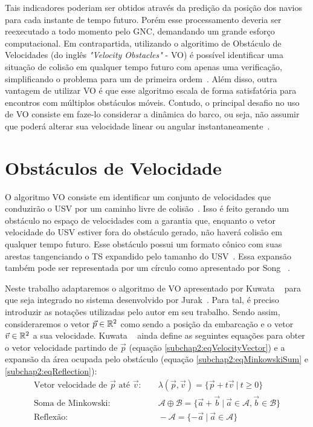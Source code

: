         Tais indicadores poderiam ser obtidos através da predição da posição dos navios para cada instante de tempo futuro. Porém esse processamento deveria ser reexecutado a todo momento pelo GNC, demandando um grande esforço computacional. Em contrapartida, utilizando o algoritimo de Obstáculo de Velocidades (do inglês \textit{"Velocity Obstacles"} - VO) é possível identificar uma situação de colisão em qualquer tempo futuro com apenas uma verificação, simplificando o problema para um de primeira ordem~\cite{KUWATA2014110}. Além disso, outra vantagem de utilizar VO é que esse algoritmo escala de forma satisfatória para encontros com múltiplos obstáculos móveis. Contudo, o principal desafio no uso de VO consiste em faze-lo considerar a dinâmica do barco, ou seja, não assumir que poderá alterar sua velocidade linear ou angular instantaneamente~\cite{HUANG2019142}.
        
    \section{Obstáculos de Velocidade}\label{subchap2:vo}
        O algoritmo VO consiste em identificar um conjunto de velocidades que conduzirão o USV por um caminho livre de colisão~\cite{HUANG2019142}. Isso é feito gerando um obstáculo no espaço de velocidades com a garantia que, enquanto o vetor velocidade do USV estiver fora do obstáculo gerado, não haverá colisão em qualquer tempo futuro. Esse obstáculo possui um formato cônico com suas arestas tangenciando o TS expandido pelo tamanho do USV~\cite{KUWATA2014110}. Essa expansão também pode ser representada por um círculo como apresentado por Song \etal~\cite{SONG2018351}.
        
        Neste trabalho adaptaremos o algoritmo de VO apresentado por Kuwata \etal ~\cite{KUWATA2014110} para que seja integrado no sistema desenvolvido por Jurak~\cite{JURAK2020}. Para tal, é preciso introduzir as notações utilizadas pelo autor em seu trabalho. Sendo assim, consideraremos o vetor $\vec{p} \in \mathbb{R}^2$ como sendo a posição da embarcação e o vetor $\vec{v} \in \mathbb{R}^2$ a sua velocidade. Kuwata \etal ~\cite{KUWATA2014110} ainda define as seguintes equações para obter o vetor velocidade partindo de $\vec{p}$ (equação \eqref{subchap2:eqVelocityVector}) e a expansão da área ocupada pelo obstáculo (equação \eqref{subchap2:eqMinkowskiSum} e \eqref{subchap2:eqReflection}):
        \begin{align}
            \text{Vetor velocidade de $\vec{p}$ até $\vec{v}$:}\quad&~\lambda(\vec{p}, \vec{v}) = \{\vec{p} + t\vec{v}~|~t \geq 0\}\label{subchap2:eqVelocityVector}\\
            \text{Soma de Minkowski:}\quad&~\mathcal{A} \oplus \mathcal{B}= \{\vec{a} + \vec{b}~|~\vec{a} \in \mathcal{A}, \vec{b} \in \mathcal{B}\}\label{subchap2:eqMinkowskiSum}\\
            \text{Reflexão:}\quad&~- \mathcal{A}= \{- \vec{a}~|~\vec{a} \in \mathcal{A}\}\label{subchap2:eqReflection}
        \end{align}
        
